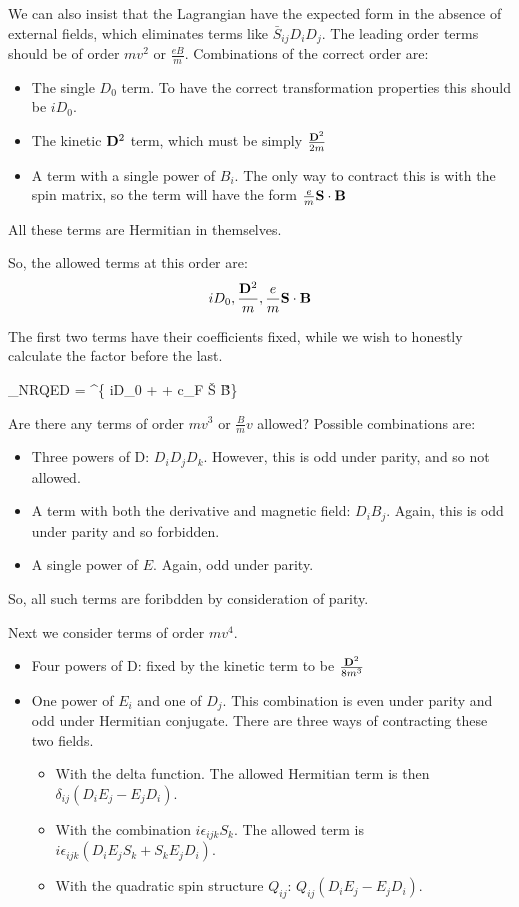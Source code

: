We can also insist that the Lagrangian have the expected form in the absence of external fields, which eliminates terms like $\bar{S}_{ij}D_i D_j$.  The leading order terms should be of order $mv^2$ or $\frac{eB}{m}$.  Combinations of the correct order are:
\begin{itemize}
  \item The single $D_0$ term.  To have the correct transformation properties this should be $iD_0$.
  \item The kinetic $\mathbf{D}^2$ term, which must be simply $\frac{\mathbf{D}^2}{2m}$
  \item A term with a single power of $B_i$.  The only way to contract this is with the spin matrix, so the term will have the form $\frac{e}{m} \mathbf{S} \cdot \mathbf{B}$
\end{itemize}
All these terms are Hermitian in themselves.

So, the allowed terms at this order are:
\[
	iD_0, \frac{\mathbf{D}^2}{m}, \frac{e}{m} \mathbf{S} \cdot \mathbf{B}
\]

The first two terms have their coefficients fixed, while we wish to honestly calculate the factor before the last.

\beq \label{eq:nrLFirstOrder}
	_{NRQED} = \Psi^\dagger \Bigg\{ iD_0 +    +  c_F  \v{S} \cdot \v{B}\Bigg \} \Psi
\eeq

Are there any terms of order $mv^3$ or $\frac{B}{m}v$ allowed?  Possible combinations are:
\begin{itemize}
  \item Three powers of D: $D_i D_j D_k$.  However, this is odd under parity, and so not allowed.  
  \item A term with both the derivative and magnetic field: $D_i B_j$.  Again, this is odd under parity and so forbidden.
  \item A single power of $E$.  Again, odd under parity.
\end{itemize}
So, all such terms are foribdden by consideration of parity.

Next we consider terms of order $mv^4$.
\begin{itemize}
  \item Four powers of D: fixed by the kinetic term to be $\frac{\mathbf{D}^2}{8m^3}$
  \item One power of $E_i$ and one of $D_j$.  This combination is even under parity and odd under Hermitian conjugate.  There are three ways of contracting these two fields.
  \begin{itemize}
  		\item	With the delta function.  The allowed Hermitian term is then $\delta_{ij}(D_i E_j - E_j D_i)$.
  		\item	With the combination $i\epsilon_{ijk} S_k$.  The allowed term is $i\epsilon_{ijk}(D_i E_j S_k + S_k E_j D_i)$.
  		\item 	With the quadratic spin structure $Q_{ij}$: $ Q_{ij} ( D_i E_j - E_j D_i)$.
  \end{itemize}
\end{itemize}

